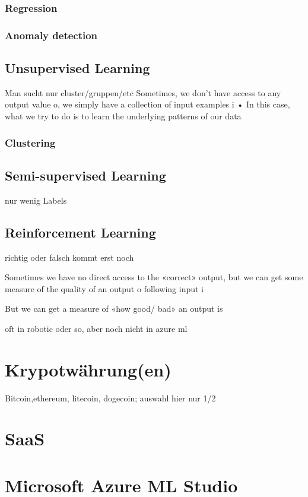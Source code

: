 \subsubsection{Regression}
\subsubsection{Anomaly detection}



\subsection{Unsupervised Learning}
Man sucht nur cluster/gruppen/etc
Sometimes, we don’t have access to any
output value o, we simply have a
collection of input examples i
• In this case, what we try to do is to learn
the underlying patterns of our data
\subsubsection{Clustering}


\subsection{Semi-supervised Learning}
nur wenig Labels


\subsection{Reinforcement Learning}
richtig oder falsch kommt erst noch

Sometimes we have no direct access to the
«correct» output, but we can get some
measure of the quality of an output o
following input i

But we can get a measure of «how good/
bad» an output is

oft in robotic oder so, aber noch nicht in azure ml

\section{Krypotwährung(en)}
Bitcoin,ethereum, litecoin, dogecoin; auswahl hier nur 1/2


\section{SaaS}
\section{Microsoft Azure ML Studio}
